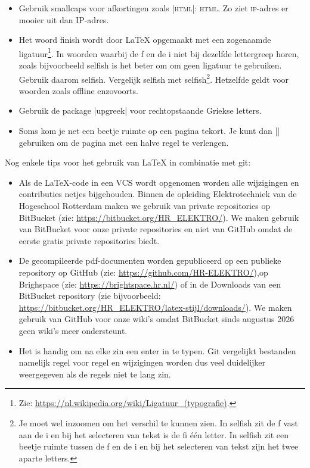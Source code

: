 \begin{itemize}
    \item Gebruik smallcaps voor afkortingen zoals |\textsc{html}|: \textsc{html}.
    Zo ziet \textsc{ip}-adres er mooier uit dan IP-adres.
    \item Het woord finish wordt door \LaTeX{} opgemaakt met een zogenaamde ligatuur\footnote{%
    	Zie: \url{https://nl.wikipedia.org/wiki/Ligatuur_(typografie)}.
    }. In woorden waarbij de f en de i niet bij dezelfde lettergreep horen, zoals bijvoorbeeld selfish is het beter om  om geen ligatuur te gebruiken.
    Gebruik daarom  self\makebox{}ish.
    Vergelijk selfish met self\makebox{}ish\footnote{%
    	Je moet wel inzoomen om het verschil te kunnen zien. In selfish zit de f vast aan de i en bij het selecteren van tekst is de fi één letter. In self\makebox{}ish zit een beetje ruimte tussen de f en de i en bij het selecteren van tekst zijn het twee aparte letters.  
	}.
    Hetzelfde geldt voor woorden zoals off\makebox{}line enzovoorts.
    \item Gebruik de package |upgreek| voor rechtopstaande Griekse letters.
    \item Soms kom je net een beetje ruimte op een pagina tekort.
    Je kunt dan |\enlargethispage{.5\baselineskip}| gebruiken om de pagina met een halve regel te verlengen.
\end{itemize}

Nog enkele tips voor het gebruik van \LaTeX{} in combinatie met git:
\begin{itemize}
    \item 
	    Als de \LaTeX{}-code in een VCS wordt opgenomen worden alle wijzigingen en contributies netjes bijgehouden.
        Binnen de opleiding Elektrotechniek van de Hogeschool Rotterdam maken we gebruik van private repositories op BitBucket (zie: \url{https://bitbucket.org/HR_ELEKTRO/}).
        We maken gebruik van BitBucket voor onze private repositories en niet van GitHub omdat de eerste gratis private repositories biedt.
    \item 
        De gecompileerde pdf-documenten worden gepubliceerd op een publieke repository op GitHub (zie: \url{https://github.com/HR-ELEKTRO/}),op Brighspace (zie: \url{https://brightspace.hr.nl/}) of in de Downloads van een BitBucket repository (zie bijvoorbeeld: \url{https://bitbucket.org/HR_ELEKTRO/latex-stijl/downloads/}).
        We maken gebruik van GitHub voor onze wiki's omdat BitBucket sinds augustus 2026 geen wiki's meer ondersteunt.
    \item 
	    Het is handig om na elke zin een enter in te typen.
	    Git vergelijkt bestanden namelijk regel voor regel en wijzigingen worden dus veel duidelijker weergegeven als de regels niet te lang zin.
\end{itemize}
